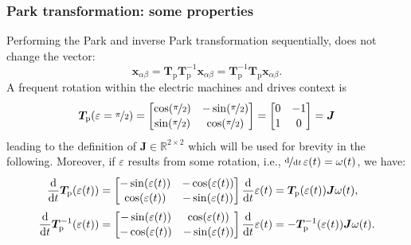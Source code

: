 \begin{frame}
	\frametitle{Park transformation: some properties}
    Performing the Park and inverse Park transformation sequentially, does not change the vector:
    \begin{equation}
        \bm{x}_{\alpha \beta} = \bm{T}_\mathrm{p} \bm{T}_\mathrm{p}^{-1} \bm{x}_{\alpha \beta} = \bm{T}_\mathrm{p}^{-1} \bm{T}_\mathrm{p} \bm{x}_{\alpha \beta}.
    \end{equation}
    A frequent rotation within the electric machines and drives context is
    \begin{equation}
        \renewcommand{\arraystretch}{1.1}
         \bm{T}_\mathrm{p}(\varepsilon = \nicefrac{\pi}{2}) = \begin{bmatrix}
            \cos(\nicefrac{\pi}{2}) & -\sin(\nicefrac{\pi}{2})\\
            \sin(\nicefrac{\pi}{2}) & \cos(\nicefrac{\pi}{2})
        \end{bmatrix} = \begin{bmatrix}
            0 & -1\\
            1 & 0
        \end{bmatrix} = \bm{J}
    \end{equation}
    leading to the definition of $\bm{J}\in\mathbb{R}^{2 \times 2}$ which will be used for brevity in the following.  Moreover, if $\varepsilon$ results from some rotation, i.e., $\nicefrac{\mathrm{d}}{\mathrm{d}t}\,\varepsilon(t)=\omega(t)$, we have:
    \begin{align}
        \renewcommand{\arraystretch}{1.1}
        \frac{\mathrm{d}}{\mathrm{d}t}\bm{T}_\mathrm{p}(\varepsilon(t)) &= \begin{bmatrix}
            -\sin(\varepsilon(t)) & -\cos(\varepsilon(t))\\
            \cos(\varepsilon(t)) & -\sin(\varepsilon(t))
        \end{bmatrix} \frac{\mathrm{d}}{\mathrm{d}t}\varepsilon(t)  = \bm{T}_\mathrm{p}(\varepsilon(t)) \bm{J}\omega(t),\\
        \frac{\mathrm{d}}{\mathrm{d}t}\bm{T}_\mathrm{p}^{-1}(\varepsilon(t)) &= \begin{bmatrix}
            -\sin(\varepsilon(t)) & \cos(\varepsilon(t))\\
            -\cos(\varepsilon(t)) & -\sin(\varepsilon(t))
        \end{bmatrix} \frac{\mathrm{d}}{\mathrm{d}t}\varepsilon(t)  = -\bm{T}_\mathrm{p}^{-1}(\varepsilon(t)) \bm{J}\omega(t).
    \end{align}
\end{frame}


